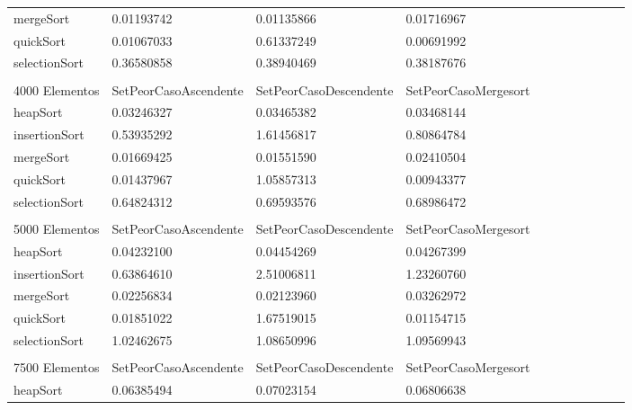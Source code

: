 \documentclass[article,a4paper]{article}
\begin{document}
\begin{table}[h]
\begin{adjustbox}{width=\textwidth,totalheight=\textheight,keepaspectratio}
\begin{tabular}{lllllllllll}
mergeSort       & 0.01193742            & 0.01135866             & 0.01716967           \\
quickSort       & 0.01067033            & 0.61337249             & 0.00691992           \\
selectionSort   & 0.36580858            & 0.38940469             & 0.38187676           \\
                &                       &                        &                      \\
4000 Elementos  & SetPeorCasoAscendente & SetPeorCasoDescendente & SetPeorCasoMergesort \\
heapSort        & 0.03246327            & 0.03465382             & 0.03468144           \\
insertionSort   & 0.53935292            & 1.61456817             & 0.80864784           \\
mergeSort       & 0.01669425            & 0.01551590             & 0.02410504           \\
quickSort       & 0.01437967            & 1.05857313             & 0.00943377           \\
selectionSort   & 0.64824312            & 0.69593576             & 0.68986472           \\
                &                       &                        &                      \\
5000 Elementos  & SetPeorCasoAscendente & SetPeorCasoDescendente & SetPeorCasoMergesort \\
heapSort        & 0.04232100            & 0.04454269             & 0.04267399           \\
insertionSort   & 0.63864610            & 2.51006811             & 1.23260760           \\
mergeSort       & 0.02256834            & 0.02123960             & 0.03262972           \\
quickSort       & 0.01851022            & 1.67519015             & 0.01154715           \\
selectionSort   & 1.02462675            & 1.08650996             & 1.09569943           \\
                &                       &                        &                      \\
7500 Elementos  & SetPeorCasoAscendente & SetPeorCasoDescendente & SetPeorCasoMergesort \\
heapSort        & 0.06385494            & 0.07023154             & 0.06806638           \\

\end{tabular}
\end{adjustbox}
\end{table}
\end{document}
